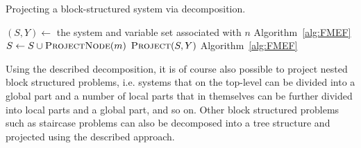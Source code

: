 \documentclass{llncs}
\begin{document}
\begin{algorithm}[tb]
\caption{{Projecting a block-structured system via decomposition.}}
\label{alg:decomp}
\begin{algorithmic}
	\State $(S,Y)\gets$ the system and variable set associated with $n$
		\State \Return {}\Comment Algorithm~\ref{alg:FMEF}
	\Else
			\State $S \gets S\cup \Call{ProjectNode}{m}$ 
		\EndFor
		\State \Return $\Call{Project}{S, Y}$ \Comment Algorithm~\ref{alg:FMEF}
	\EndIf
\EndFunction
\end{algorithmic}
\end{algorithm}
%
\noindent Using the described decomposition, it is of course also possible to project nested block structured problems, i.e. systems that on the top-level can be divided into a global part and a number of local parts that in themselves can be further divided into local parts and a global part, and so on.  
Other block structured problems such as staircase problems can also be decomposed into a tree structure and projected using the described approach. 
\end{document}
